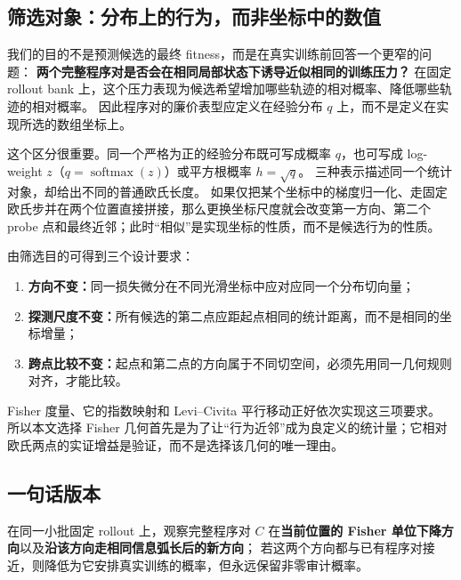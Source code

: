 \documentclass[UTF8,11pt]{ctexart}
\newcommand{\softmax}{\operatorname{softmax}}
\begin{document}
\subsection{筛选对象：分布上的行为，而非坐标中的数值}

我们的目的不是预测候选的最终 fitness，而是在真实训练前回答一个更窄的问题：
\textbf{两个完整程序对是否会在相同局部状态下诱导近似相同的训练压力？}
在固定 rollout bank 上，这个压力表现为候选希望增加哪些轨迹的相对概率、降低哪些轨迹的相对概率。
因此程序对的廉价表型应定义在经验分布 $q$ 上，而不是定义在实现所选的数组坐标上。

这个区分很重要。同一个严格为正的经验分布既可写成概率 $q$，也可写成 log-weight $z$（$q=\softmax(z)$）或平方根概率 $h=\sqrt q$。
三种表示描述同一个统计对象，却给出不同的普通欧氏长度。
如果仅把某个坐标中的梯度归一化、走固定欧氏步并在两个位置直接拼接，那么更换坐标尺度就会改变第一方向、第二个 probe 点和最终近邻；此时“相似”是实现坐标的性质，而不是候选行为的性质。

由筛选目的可得到三个设计要求：
\begin{enumerate}
  \item \textbf{方向不变：}同一损失微分在不同光滑坐标中应对应同一个分布切向量；
  \item \textbf{探测尺度不变：}所有候选的第二点应距起点相同的统计距离，而不是相同的坐标增量；
  \item \textbf{跨点比较不变：}起点和第二点的方向属于不同切空间，必须先用同一几何规则对齐，才能比较。
\end{enumerate}
Fisher 度量、它的指数映射和 Levi--Civita 平行移动正好依次实现这三项要求。
所以本文选择 Fisher 几何首先是为了让“行为近邻”成为良定义的统计量；它相对欧氏两点的实证增益是验证，而不是选择该几何的唯一理由。

\subsection{一句话版本}

在同一小批固定 rollout 上，观察完整程序对 $C$ 在\textbf{当前位置的 Fisher 单位下降方向}以及\textbf{沿该方向走相同信息弧长后的新方向}；
若这两个方向都与已有程序对接近，则降低为它安排真实训练的概率，但永远保留非零审计概率。
\end{document}
